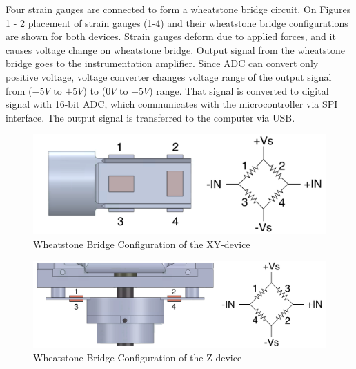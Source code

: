 Four strain gauges are connected to form a wheatstone bridge circuit. On Figures \ref{fig:WB_xy_dev} - \ref{fig:WB_z} placement of strain gauges (1-4) and their wheatstone bridge configurations are shown for both devices. Strain gauges deform due to applied forces, and it causes voltage change on wheatstone bridge. Output signal from the wheatstone bridge goes to the instrumentation amplifier. Since ADC can convert only positive voltage, voltage converter changes voltage range of the output signal from ($-5V$ to $+5V$) to ($0V$ to $+5V$) range. That signal is converted to digital signal with 16-bit ADC, which communicates with the microcontroller via SPI interface. The output signal is transferred to the computer via USB. 
	
\begin{figure}[h]
	\begin{center}
		\includegraphics[width=120mm]{fig/methods/Wiring_xy_sleeve.pdf}
	\end{center}
	\vspace{-4mm}
	\caption[Wheatstone bridge configuration of XY-device]
	{Wheatstone Bridge Configuration of the XY-device}
	\label{fig:WB_xy_dev}
	\vspace{-2mm}
\end{figure}

\begin{figure}[h]
	\begin{center}
		\includegraphics[width=140mm]{fig/methods/Wiring_z.pdf}
	\end{center}
	\vspace{-4mm}
	\caption[Wheatstone bridge configuration of Z-device]
	{Wheatstone Bridge Configuration of the Z-device}
	\label{fig:WB_z}
	\vspace{-2mm}
\end{figure}
	
